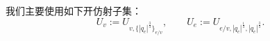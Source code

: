 我们主要使用如下开仿射子集：
\[
U_v:=U_{v,\{|q_e|^{\frac34}\}_{e/v}},\qquad
U_e:=U_{e/v,|q_e|^{\frac14},|q_e|^{\frac34}}.
\]
